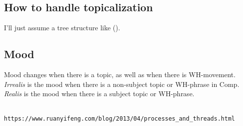 \documentclass[12pt]{article}
\begin{document}
\subsection*{How to handle topicalization}

I'll just assume a tree structure like ().

{\small
{}
}

\subsection*{Mood}

Mood changes when there is a topic, as well as when
there is WH-movement.  \emph{Irrealis} is the mood when
there is a non-subject topic or WH-phrase in Comp.
\emph{Realis} is the mood when there is a subject topic
or WH-phrase.

\begin{thebibliography}
  \\\texttt{https://www.ruanyifeng.com/blog/2013/04/processes\_and\_threads.html}
\end{thebibliography}
  
\end{document}
